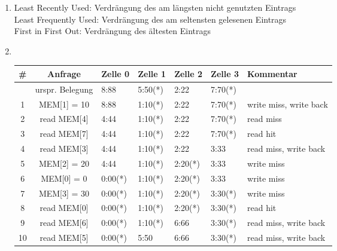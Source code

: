 \documentclass[10pt,a4paper]{article}
\begin{document}
\begin{enumerate}
		\item Least Recently Used: Verdrängung des am längsten nicht genutzten Eintrags \\
					Least Frequently Used: Verdrängung des am seltensten gelesenen Eintrags \\
					First in First Out: Verdrängung des ältesten Eintrags
		\item \text{}\\
			\begin{tabular}{cc|lllll}
				\# & Anfrage         & Zelle 0 & Zelle 1 & Zelle 2 & Zelle 3 & Kommentar              \\ \hline
				   & urspr. Belegung & 8:88    & 5:50(*) & 2:22    & 7:70(*) &                        \\
				 1 & MEM[1] = 10     & 8:88    & 1:10(*) & 2:22    & 7:70(*) & write miss, write back \\
				 2 & read MEM[4]     & 4:44    & 1:10(*) & 2:22    & 7:70(*) & read miss              \\
				 3 & read MEM[7]     & 4:44    & 1:10(*) & 2:22    & 7:70(*) & read hit               \\ 
				 4 & read MEM[3]     & 4:44    & 1:10(*) & 2:22    & 3:33    & read miss, write back  \\ 
				 5 & MEM[2] = 20     & 4:44    & 1:10(*) & 2:20(*) & 3:33    & write miss             \\
				 6 & MEM[0] = 0      & 0:00(*) & 1:10(*) & 2:20(*) & 3:33    & write miss             \\ 
				 7 & MEM[3] = 30     & 0:00(*) & 1:10(*) & 2:20(*) & 3:30(*) & write miss             \\ 
				 8 & read MEM[0]     & 0:00(*) & 1:10(*) & 2:20(*) & 3:30(*) & read hit               \\ 
				 9 & read MEM[6]     & 0:00(*) & 1:10(*) & 6:66    & 3:30(*) & read miss, write back  \\ 
				10 & read MEM[5]     & 0:00(*) & 5:50    & 6:66    & 3:30(*) & read miss, write back  \\ 
			\end{tabular}
	\end{enumerate}
			
\end{document}
